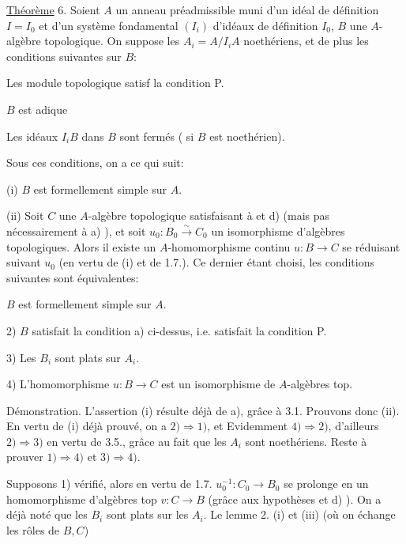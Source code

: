 
\uline{Théorème} 6. Soient $A$ un anneau préadmissible muni d'un idéal de
définition $I=I_0$ et d'un système fondamental $(I_i)$ d'idéaux de définition
$I_0$, $B$ une $A$-algèbre topologique. On suppose les $A_i=A/I_iA$ noethériens,
et de plus les conditions suivantes sur $B$:


 Les module topologique
 
 satisf la condition P.


 $B$ est adique 

 Les idéaux $I_iB$ dans $B$ sont fermés ( si $B$ est noethérien).

Sous ces conditions, on a ce qui suit:

(i) $B$ est formellement simple sur $A$.

(ii) Soit $C$ une $A$-algèbre topologique satisfaisant à  et d)
(mais pas nécessairement à a) ), et soit $u_0:B_0\xrightarrow{\sim}C_0$ un isomorphisme
d'algèbres topologiques. Alors il existe un $A$-homomorphisme continu
$u:B\longrightarrow C$ se réduisant suivant $u_0$ (en vertu de (i) et de 1.7.). Ce
dernier étant choisi, les conditions suivantes sont équivalentes: 

 $B$ est formellement simple sur $A$.

2)  $B$ satisfait la condition a) ci-dessus, i.e.  satisfait
la condition P.

3) Les $B_i$ sont plats sur $A_i$.

4) L'homomorphisme $u:B\longrightarrow C$ est un isomorphisme\deleted{\unsure{,}} de $A$-algèbres top.


Démonstration. L'assertion (i) résulte déjà de a), grâce à 3.1.
Prouvons donc (ii). En vertu de (i) déjà prouvé, on a $2)\Longrightarrow1)$, et
Evidemment $4)\Longrightarrow2)$, d'ailleurs $2)\Longrightarrow3)$ en vertu de 3.5., grâce au
fait que les $A_i$ sont noethériens. Reste à prouver $1)\Longrightarrow4)$ et $3)\Longrightarrow4)$.

Supposons 1) vérifié, alors en vertu de 1.7. $u_0^{-1}:C_0\longrightarrow B_0$
se prolonge en un homomorphisme d'algèbres top $v:C\longrightarrow B$ (grâce aux
hypothèses  et d) ). On a déjà noté que les $B_i$ sont plats sur les
$A_i$. Le lemme 2. (i) et (iii) (où on échange les rôles de $B,C$)

